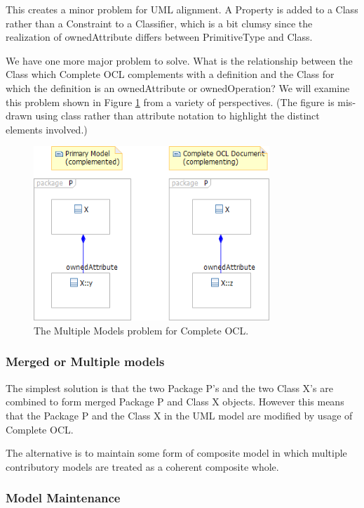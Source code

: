 \documentclass{eceasst}
\begin{document}
This creates a minor problem for UML alignment. A Property is added to a Class rather than a Constraint to a Classifier, which is a bit clumsy since the realization of ownedAttribute differs between PrimitiveType and Class.

We have one more major problem to solve. What is the relationship between the Class which Complete OCL complements with a definition and the Class for which the definition is an ownedAttribute or ownedOperation? We will examine this problem shown in Figure \ref{fig:MultipleModels} from a variety of perspectives. (The figure is mis-drawn using class rather than attribute notation to highlight the distinct elements involved.)

\begin{figure}
  \begin{center}
    \includegraphics[width=3.5in]{MultipleModels.png}
  \end{center}
  \caption{The Multiple Models problem for Complete OCL.}
  \label{fig:MultipleModels}
\end{figure}

\subsubsection{Merged or Multiple models}

The simplest solution is that the two Package P's and the two Class X's are combined to form merged Package P and  Class X objects. However this means that the Package P and the Class X in the UML model are modified by usage of Complete OCL.

The alternative is to maintain some form of composite model in which multiple contributory models are treated as a coherent composite whole.

\subsubsection{Model Maintenance}
\end{document}

